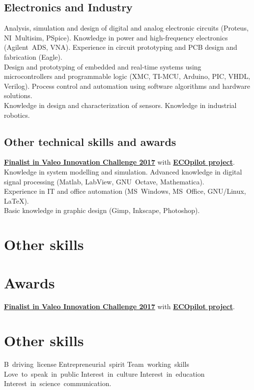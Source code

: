 \documentclass[11pt,a4paper,sans,spanish]{moderncv}
\begin{document}
\subsection{Electronics and Industry}
Analysis, simulation and design of digital and analog electronic circuits (Proteus, NI~Multisim, PSpice). Knowledge in power and high-frequency electronics (Agilent~ADS, VNA). Experience in circuit prototyping and PCB design and fabrication (Eagle).
\protect\\[0.4em]
Design and prototyping of embedded and real-time systems using microcontrollers and programmable logic (XMC, TI-MCU, Arduino, PIC, VHDL, Verilog).
Process control and automation using software algorithms and hardware solutions.
\protect\\[0.4em]
Knowledge in design and characterization of sensors. Knowledge in industrial robotics.


\subsection{Other technical skills and awards}
\textbf{\href{https://valeoinnovationchallenge.valeo.com/news/interviews/introducing-team-ecopilot}{Finalist in Valeo Innovation Challenge 2017}} with \textbf{\href{http://myecopilot.com}{ECOpilot project}}.
\protect\\[0.4em]
Knowledge in system modelling and simulation. Advanced knowledge in digital signal processing (Matlab, LabView, GNU~Octave, Mathematica).
\protect\\[0.4em]
Experience in IT and office automation (MS~Windows, MS~Office, GNU/Linux, LaTeX).
\protect\\[0.4em]
Basic knowledge in graphic design (Gimp, Inkscape, Photoshop).


\section{Other skills}
\fi

\section{Awards}
\textbf{\href{https://valeoinnovationchallenge.valeo.com/news/interviews/introducing-team-ecopilot}{Finalist in Valeo Innovation Challenge 2017}} with \textbf{\href{http://myecopilot.com}{ECOpilot project}}.

\section{Other skills}
\begin{center}
B~driving~license \quad{} Entrepreneurial~spirit \quad{} Team~working~skills
\quad{} Love~to~speak~in~public \quad{} Interest~in~culture \quad{}
Interest~in~education \quad{} Interest~in~science~communication.
\end{center}
\end{document}
